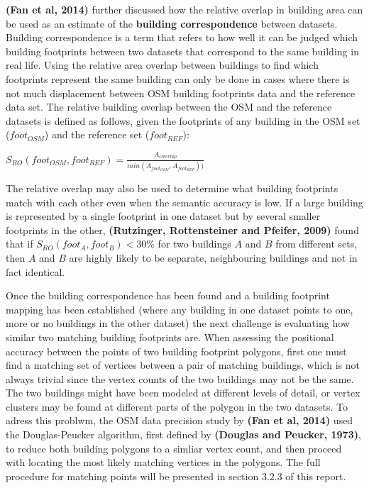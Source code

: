 \documentclass{kththesis}
\begin{document}
\textbf{(Fan et al, 2014)} further discussed how the relative overlap in building area can be used as an estimate of the \textbf{building correspondence} between datasets.
Building correspondence is a term that refers to how well it can be judged which building footprints between two datasets that correspond to the same building in real life.
Using the relative area overlap between buildings to find which footprints represent the same building can only be done in cases where there is not much displacement between OSM building footprints data and the reference data set.
The relative building overlap between the OSM and the reference datasets is defined as follows, given the footprints of any building in the OSM set ($foot_{OSM}$) and the reference set ($foot_{REF}$):
\begin{center}
    $S_{RO}(foot_{OSM}, foot_{REF}) = \frac{A_{Overlap}}{min(A_{foot_{OSM}}, A_{foot_{REF}}))}$
\end{center}

The relative overlap may also be used to determine what building footprints match with each other even when the semantic accuracy is low.
If a large building is represented by a single footprint in one dataset but by several smaller footprints in the other,
\textbf{(Rutzinger, Rottensteiner and Pfeifer, 2009)}
found that if $S_{RO}(foot_{A}, foot_{B}) < 30\%$ for two buildings $A$ and $B$ from different sets, then $A$ and $B$ are highly likely to be separate, neighbouring buildings and not in fact identical.

Once the building correspondence has been found and a building footprint mapping has been established (where any building in one dataset points to one, more or no buildings in the other dataset) the next challenge is evaluating how similar two matching building footprints are.
When assessing the positional accuracy between the points of two building footprint polygons, first one must find a matching set of vertices between a pair of matching buildings, which is not always trivial since the vertex counts of the two buildings may not be the same.
The two buildings might have been modeled at different levels of detail, or vertex clusters may be found at different parts of the polygon in the two datasets.
To adress this problwm, the OSM data precision study by \textbf{(Fan et al, 2014)} used the Douglas-Peucker algorithm, first defined by \textbf{(Douglas and Peucker, 1973)}, to reduce both building polygons to a simliar vertex count, and then proceed with locating the most likely matching vertices in the polygons.
The full procedure for matching points will be presented in section 3.2.3 of this report.
\end{document}
